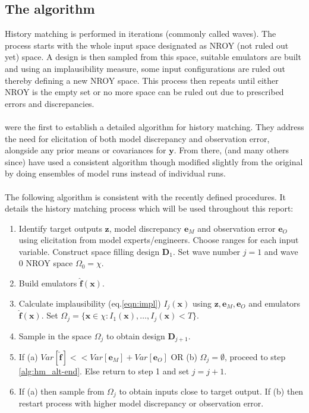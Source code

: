 \documentclass{article}
\newcommand{\emulator}{\hat{f}}
\newcommand{\inputVec}{\mathbf{x}}
\newcommand{\outputVec}{\mathbf{y}}
\newcommand{\design}{\mathbf{D}}
\newcommand{\obsqD}{\mathbf{z}}
\newcommand{\obsErrorqD}{\mathbf{e}_O}
\newcommand{\modelDiscqD}{\mathbf{e}_M}
\newcommand{\paramSpace}{\chi}
\newcommand{\impl}{I}
\newcommand{\NROYspace}{\Omega}
\newcommand{\thresh}{T}
\begin{document}
\subsection{The algorithm}
\label{section:hm-algorithm}
History matching is performed in iterations (commonly called waves). The process starts with the whole input space designated as NROY (not ruled out yet) space. A design is then sampled from this space, suitable emulators are built and using an implausibility measure, some input configurations are ruled out thereby defining a new NROY space. This process then repeats until either NROY is the empty set or no more space can be ruled out due to prescribed errors and discrepancies.\\\\
\citet{Craig1996,Craig1997} were the first to establish a detailed algorithm for history matching. They address the need for elicitation of both model discrepancy and observation error, alongside any prior means or covariances for $\outputVec$. From there, \citet{Vernon2010,Vernon2014,Andrianakis2015} (and many others since) have used a consistent algorithm though modified slightly from the original by doing ensembles of model runs instead of individual runs.\\\\
The following algorithm is consistent with the recently defined procedures. It details the history matching process which will be used throughout this report:
\begin{enumerate}
    \item \label{section:hm-setup} Identify target outputs $\obsqD$, model discrepancy $\modelDiscqD$ and observation error $\obsErrorqD$ using elicitation from model experts/engineers. Choose ranges for each input variable. Construct space filling design $\design_1$. Set wave number $j=1$ and wave 0 NROY space $\NROYspace_0 = \paramSpace$.

    \item Build emulators $\mathbf{\emulator}(\inputVec)$.

    \item Calculate implausibility (eq.\eqref{eqn:impl}) $\impl_j(\inputVec)$ using $\obsqD,\modelDiscqD,\obsErrorqD$ and emulators $\mathbf{\emulator}(\inputVec)$. Set $\NROYspace_j = \{\inputVec \in \paramSpace:\impl_1(\inputVec),\dots,\impl_j(\inputVec)<\thresh\}$.

    \item \label{section:hm-refocus} Sample in the space $\NROYspace_j$ to obtain design $\design_{j+1}$.

    \item If (a) $Var\left[\mathbf{\emulator}\right]<<Var[\modelDiscqD]+Var[\obsErrorqD]$ OR (b) $\NROYspace_j = \emptyset$, proceed to step \ref{alg:hm_alt-end}. Else return to step 1 and set $j=j+1$.

    \item \label{alg:hm_alt-end} If (a) then sample from $\NROYspace_j$ to obtain inputs close to target output. If (b) then restart process with higher model discrepancy or observation error.
\end{enumerate} 
\end{document}
